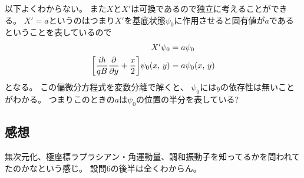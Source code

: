 \documentclass[../../master.tex]{subfiles}
\begin{document}
以下よくわからない。
また\(X\)と\(X'\)は可換であるので独立に考えることができる。
\(X'=a\)というのはつまり\(X'\)を基底状態\(\psi_0\)に作用させると固有値が\(a\)であるということを表しているので
\begin{equation}\begin{aligned}[b]
    X'\psi_0 &= a \psi_0\\
    \qty[\frac{i\hbar}{qB}\pdv{y}+\frac{x}{2}]\psi_0(x,\,y) &= a\psi_0(x,\,y)
\end{aligned}\end{equation}
となる。
この偏微分方程式を変数分離で解くと、
\(\psi_0\)には\(y\)の依存性は無いことがわかる。
つまりこのときの\(a\)は\(\psi_0\)の位置の半分を表している?

\subsection*{感想}
無次元化、極座標ラプラシアン・角運動量、調和振動子を知ってるかを問われてたのかなという感じ。
設問6の後半は全くわからん。
\end{document}

